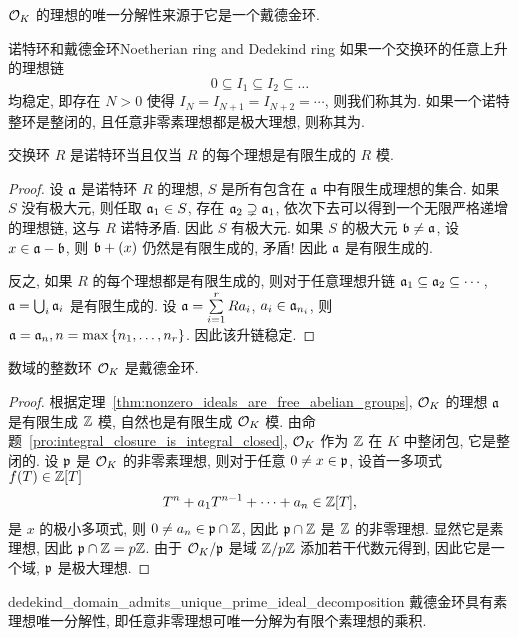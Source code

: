 ${\mathcal{O}}_K$ 的理想的唯一分解性来源于它是一个戴德金环.

\begin{definition}{诺特环和戴德金环}{Noetherian ring and Dedekind ring}
如果一个交换环的任意上升的理想链
  \[0\subseteq I_1\subseteq I_2\subseteq \dots \]
均稳定, 即存在 $N>0$ 使得 $I_N=I_{N+1}=I_{N+2}=\cdots$, 则我们称其为. 
如果一个诺特整环是整闭的, 且任意非零素理想都是极大理想, 则称其为.
\end{definition}

\begin{proposition}{}{}
交换环 $R$ 是诺特环当且仅当 $R$ 的每个理想是有限生成的 $R$ 模.
\end{proposition}
\begin{proof}
设 ${\mathfrak{a}}$ 是诺特环 $R$ 的理想, $S$ 是所有包含在 ${\mathfrak{a}}$ 中有限生成理想的集合. 如果 $S$ 没有极大元, 则任取 ${\mathfrak{a}}_1\in S$, 存在 ${\mathfrak{a}}_2\supsetneq {\mathfrak{a}}_1$, 依次下去可以得到一个无限严格递增的理想链, 这与 $R$ 诺特矛盾. 因此 $S$ 有极大元. 如果 $S$ 的极大元 ${\mathfrak{b}}\neq {\mathfrak{a}}$, 设 $x\in{\mathfrak{a}}-{\mathfrak{b}}$, 则 ${\mathfrak{b}}+(x)$ 仍然是有限生成的, 矛盾! 因此 ${\mathfrak{a}}$ 是有限生成的.

反之, 如果 $R$ 的每个理想都是有限生成的, 则对于任意理想升链 ${\mathfrak{a}}_1\subseteq {\mathfrak{a}}_2\subseteq \cdots$, ${\mathfrak{a}}=\bigcup_i{\mathfrak{a}}_i$ 是有限生成的. 设 ${\mathfrak{a}}=\sum\limits_{i=1}^r Ra_i$, $a_i\in {\mathfrak{a}}_{n_i}$, 则 ${\mathfrak{a}}={\mathfrak{a}}_n,n=\max\left\{n_1,\dots,n_r\right\}$. 因此该升链稳定.
\end{proof}

\begin{theorem}{}{}
数域的整数环 ${\mathcal{O}}_K$ 是戴德金环.
\end{theorem}
\begin{proof}
根据定理~\ref{thm:nonzero_ideals_are_free_abelian_groups}, ${\mathcal{O}}_K$ 的理想 ${\mathfrak{a}}$ 是有限生成 ${\mathbb{Z}}$ 模, 自然也是有限生成 ${\mathcal{O}}_K$ 模. 由命题~\ref{pro:integral_closure_is_integral_closed}, ${\mathcal{O}}_K$ 作为 ${\mathbb{Z}}$ 在 $K$ 中整闭包, 它是整闭的. 设 ${\mathfrak{p}}$ 是 ${\mathcal{O}}_K$ 的非零素理想, 则对于任意 $0\neq x\in{\mathfrak{p}}$, 设首一多项式 $f(T)\in{\mathbb{Z}}[T]$
  \[T^n+a_1T^{n-1}+\dots+a_n\in{\mathbb{Z}}[T],\]
是 $x$ 的极小多项式, 则 $0\neq a_n\in{\mathfrak{p}}\cap {\mathbb{Z}}$, 因此 ${\mathfrak{p}}\cap {\mathbb{Z}}$ 是 ${\mathbb{Z}}$ 的非零理想. 显然它是素理想, 因此 ${\mathfrak{p}}\cap{\mathbb{Z}}=p{\mathbb{Z}}$. 由于 ${\mathcal{O}}_K/{\mathfrak{p}}$ 是域 ${\mathbb{Z}}/p{\mathbb{Z}}$ 添加若干代数元得到, 因此它是一个域, ${\mathfrak{p}}$ 是极大理想.  
\end{proof}

\begin{theorem}{}{dedekind_domain_admits_unique_prime_ideal_decomposition}
戴德金环具有素理想唯一分解性, 即任意非零理想可唯一分解为有限个素理想的乘积.
\end{theorem}

